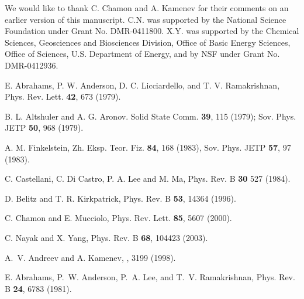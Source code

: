 \documentclass[prb,twocolumn]{revtex4}
\begin{document}
\acknowledgements
We would like to thank C. Chamon and A. Kamenev for their comments
on an earlier version of this manuscript. C.N. was supported by
the National Science Foundation under Grant No. DMR-0411800. X.Y. was
supported by the Chemical Sciences, Geosciences and Biosciences Division,
Office of Basic Energy Sciences, Office of Sciences, U.S. Department of
Energy, and by NSF under Grant No. DMR-0412936.


\begin{thebibliography}{99}

 E. Abrahams, P. W. Anderson, D. C.
Licciardello, and T. V. Ramakrishnan, Phys. Rev. Lett. {\bf 42},
673 (1979).


 B. L. Altshuler and A. G. Aronov. Solid State Comm. {\bf
39}, 115 (1979); Sov. Phys. JETP {\bf 50}, 968 (1979).

 A. M. Finkelstein, Zh. Eksp. Teor. Fiz. {\bf
84}, 168 (1983), Sov. Phys. JETP {\bf 57}, 97 (1983).

 C. Castellani, C. Di Castro, P. A. Lee and M. Ma,
Phys. Rev. B {\bf 30} 527 (1984).

 D. Belitz and T. R. Kirkpatrick,
Phys. Rev. B {\bf 53}, 14364 (1996).

 C. Chamon and E. Mucciolo, Phys. Rev. Lett.
{\bf 85}, 5607 (2000).

 C. Nayak and X. Yang, Phys. Rev. B {\bf 68}, 104423 (2003).

 A.~V. Andreev and A. Kamenev, , 3199 (1998).

 E. Abrahams, P.~W. Anderson, P.~A. Lee, and T.~V. Ramakrishnan,
Phys. Rev. B {\bf 24}, 6783 (1981).


\end{thebibliography}
\end{document}
